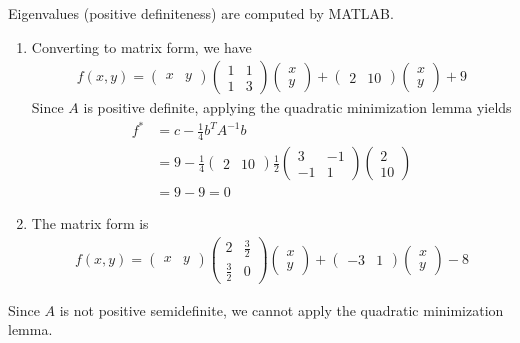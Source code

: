 \documentclass[12pt]{article}
\begin{document}
\begin{problem}[2]
Eigenvalues (positive definiteness) are computed by MATLAB.
\begin{enumerate}[label=(\alph*)]
	\item Converting to matrix form, we have
	\begin{align*}
		f(x,y) = \begin{pmatrix} x&y \end{pmatrix}  \begin{pmatrix} 1&1\\1&3 \end{pmatrix} \begin{pmatrix} x\\y \end{pmatrix}  + \begin{pmatrix} 2&10 \end{pmatrix}  \begin{pmatrix} x\\y \end{pmatrix} + 9
	\end{align*}
	Since $ A$ is positive definite, applying the quadratic minimization lemma yields 
\begin{align*}
	f^* &= c - \frac{1}{4}b^{T}A^{-1}b\\
	    &= 9 - \frac{1}{4} \begin{pmatrix} 2&10 \end{pmatrix} \frac{1}{2}\begin{pmatrix} 3&-1\\-1&1 \end{pmatrix} \begin{pmatrix} 2\\10 \end{pmatrix}  \\
	    &= 9-9=0 
\end{align*}
\item The matrix form is
	\begin{align*}
	f(x,y) = \begin{pmatrix} x&y \end{pmatrix}  \begin{pmatrix} 2&\frac{3}{2}\\\frac{3}{2}&0 \end{pmatrix} \begin{pmatrix} x\\y \end{pmatrix}  + \begin{pmatrix} -3&1 \end{pmatrix}  \begin{pmatrix} x\\y \end{pmatrix} -8
	\end{align*}
\end{enumerate}
Since $ A$ is not positive semidefinite, we cannot apply the quadratic minimization lemma.
\end{problem}
\end{document}
